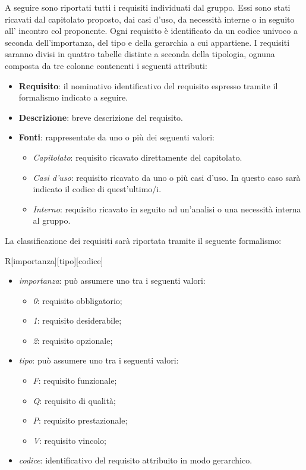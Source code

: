 A seguire sono riportati tutti i requisiti individuati dal gruppo. Essi sono stati ricavati dal capitolato proposto, dai casi d'uso, da necessità interne o in seguito all' incontro col proponente. Ogni requisito è identificato da un codice univoco a seconda dell'importanza, del tipo e della gerarchia a cui appartiene.
I requisiti saranno divisi in quattro tabelle distinte a seconda della tipologia, ognuna composta da tre colonne contenenti i seguenti attributi:
\begin{itemize}
	\item \textbf{Requisito}: il nominativo identificativo del requisito espresso tramite il formalismo indicato a seguire.
	\item \textbf{Descrizione}: breve descrizione del requisito.
	\item \textbf{Fonti}: rappresentate da uno o più dei seguenti valori:
	\begin{itemize}
		\item \emph{Capitolato}: requisito ricavato direttamente del capitolato.
		\item \emph{Casi d'uso}: requisito ricavato da uno o più casi d'uso. In questo caso sarà indicato il codice di quest'ultimo/i.
		\item \emph{Interno}: requisito ricavato in seguito ad un'analisi o una necessità interna al gruppo.
	\end{itemize}
\end{itemize}

La classificazione dei requisiti sarà riportata tramite il seguente formalismo:
\begin{center}
	R[importanza][tipo][codice]
\end{center}
\begin{itemize}
	\item \emph{importanza}: può assumere uno tra i seguenti valori:
	\begin{itemize}
		\item \emph{0}: requisito obbligatorio;
		\item \emph{1}: requisito desiderabile;
		\item \emph{2}: requisito opzionale;
	\end{itemize}
	\item \emph{tipo}: può assumere uno tra i seguenti valori:
	\begin{itemize}
		\item \emph{F}: requisito funzionale;
		\item \emph{Q}: requisito di qualità;
		\item \emph{P}: requisito prestazionale;
		\item \emph{V}: requisito vincolo;
	\end{itemize}
	\item \emph{codice}: identificativo del requisito attribuito in modo gerarchico.
\end{itemize}


